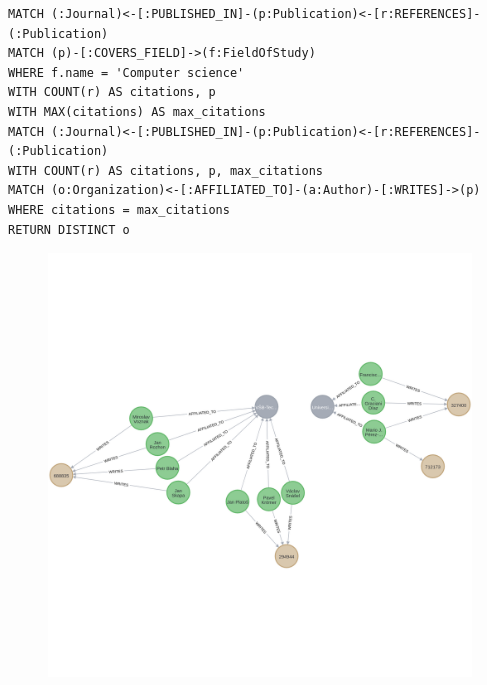 \documentclass{Configuration_Files/PoliMi3i_thesis}
\begin{document}
\begin{lstlisting}[language=cypher, label=lst:cypher-example]
MATCH (:Journal)<-[:PUBLISHED_IN]-(p:Publication)<-[r:REFERENCES]-(:Publication)
MATCH (p)-[:COVERS_FIELD]->(f:FieldOfStudy)
WHERE f.name = 'Computer science'
WITH COUNT(r) AS citations, p
WITH MAX(citations) AS max_citations
MATCH (:Journal)<-[:PUBLISHED_IN]-(p:Publication)<-[r:REFERENCES]-(:Publication)
WITH COUNT(r) AS citations, p, max_citations
MATCH (o:Organization)<-[:AFFILIATED_TO]-(a:Author)-[:WRITES]->(p)
WHERE citations = max_citations
RETURN DISTINCT o
\end{lstlisting}
\begin{figure}[H]
    \centering
    \includegraphics[height=0.5\textwidth]{Images/query_10.png}
        \caption{}
    \label{fig:quadtree}
\end{figure}
\newpage
\end{document}
